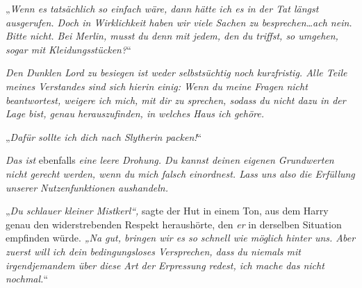 „\emph{Wenn es tatsächlich so einfach wäre, dann hätte ich es in der Tat längst ausgerufen. Doch in Wirklichkeit haben wir viele Sachen zu besprechen…ach nein. Bitte nicht. Bei Merlin, \emph{musst} du denn mit jedem, den du triffst, so umgehen, sogar mit Kleidungsstücken?}“

\emph{Den Dunklen Lord zu besiegen ist weder selbstsüchtig noch kurzfristig. Alle Teile meines Verstandes sind sich hierin einig: Wenn du meine Fragen nicht beantwortest, weigere ich mich, mit dir zu sprechen, sodass du nicht dazu in der Lage bist, genau herauszufinden, in welches Haus ich gehöre. }

„\emph{Dafür sollte ich dich nach Slytherin packen!}“

\emph{Das ist} ebenfalls \emph{eine leere Drohung. Du kannst deinen eigenen Grundwerten nicht gerecht werden, wenn du mich falsch einordnest. Lass uns also die Erfüllung unserer Nutzenfunktionen aushandeln.}

„\emph{Du schlauer kleiner Mistkerl“,} sagte der Hut in einem Ton, aus dem Harry genau den widerstrebenden Respekt heraushörte, den \emph{er} in derselben Situation empfinden würde. \emph{„Na gut, bringen wir es so schnell wie möglich hinter uns. Aber zuerst will ich dein bedingungsloses Versprechen, dass du niemals mit irgendjemandem über diese Art der Erpressung redest, ich mache das nicht nochmal.}“

